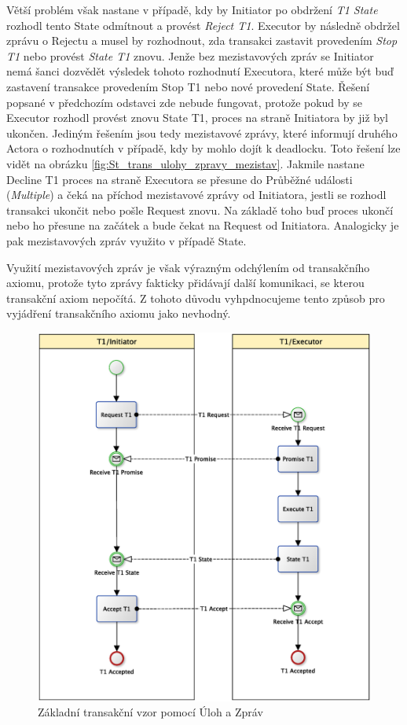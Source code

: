 \documentclass[]{article}
\begin{document}
Větší problém však nastane v případě, kdy by Initiator po obdržení \textit{T1 State} rozhodl tento State odmítnout a provést \textit{Reject T1}. Executor by následně obdržel zprávu o Rejectu a musel by rozhodnout, zda transakci zastavit provedením \textit{Stop T1} nebo provést \textit{State T1} znovu. Jenže bez mezistavových zpráv se Initiator nemá šanci dozvědět výsledek tohoto rozhodnutí Executora, které může být buď zastavení transakce provedením Stop T1 nebo nové provedení State. Řešení popsané v předchozím odstavci zde nebude fungovat, protože pokud by se Executor rozhodl provést znovu State T1, proces na straně Initiatora by již byl ukončen. Jediným řešením jsou tedy mezistavové zprávy, které informují druhého Actora o rozhodnutích v případě, kdy by mohlo dojít k deadlocku. Toto řešení lze vidět na obrázku \ref{fig:St_trans_ulohy_zpravy_mezistav}. Jakmile nastane Decline T1 proces na straně Executora se přesune do Průběžné události (\textit{Multiple}) a čeká na příchod mezistavové zprávy od Initiatora, jestli se rozhodl transakci ukončit nebo pošle Request znovu. Na základě toho buď proces ukončí nebo ho přesune na začátek a bude čekat na Request od Initiatora. Analogicky je pak mezistavových zpráv využito v případě State.

Využití mezistavových zpráv je však výrazným odchýlením od transakčního axiomu, protože tyto zprávy fakticky přidávají další komunikaci, se kterou transakční axiom nepočítá. Z tohoto důvodu vyhpdnocujeme tento způsob pro vyjádření transakčního axiomu jako nevhodný. 

\begin{figure}[H]\centering
\includegraphics[width=\textwidth,height=\textheight,keepaspectratio]{obrazky/transaction-basic-messages}
\caption{Základní transakční vzor pomocí Úloh a Zpráv}
\label{fig:Zk_trans_ulohy_zpravy}
\end{figure}
\end{document}
